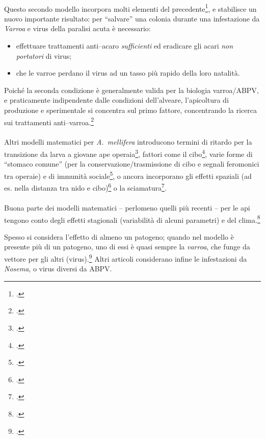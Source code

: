 \paragraph{}
Questo secondo modello incorpora molti elementi del precedente\footcite{khoury2011}, e stabilisce un nuovo
importante risultato: per ``salvare'' una colonia durante una infestazione da \emph{Varroa} e virus della
paralisi acuta è necessario:
\begin{itemize}
    \item effettuare trattamenti anti--acaro \emph{sufficienti} ed eradicare gli acari \emph{non portatori} di virus;
    \item che le varroe perdano il virus ad un tasso più rapido della loro natalità.
\end{itemize}

Poiché la seconda condizione è generalmente valida per la biologia varroa/ABPV, e praticamente indipendente
dalle condizioni dell'alveare, l'apicoltura di produzione e sperimentale si concentra sul primo fattore,
concentrando la ricerca sui trattamenti anti--varroa.\footcite{privFDL}

\paragraph{}
Altri modelli matematici per \emph{A.~mellifera} introducono termini di ritardo per la transizione da larva
a giovane ape operaia\footcite{messan2021}, fattori come il cibo\footcite{khoury2013,perry2015rapid},
varie forme di ``stomaco comune'' (per la conservazione/trasmissione di cibo e segnali feromonici tra operaie)
e di immunità sociale\footcite{schmickl2016,schmickl2017,laomettachit2021},
o ancora incorporano gli effetti spaziali (ad es. nella distanza tra nido e cibo)\footcite{spatial}
o la sciamatura\footcite{messan2017}.

\paragraph{}
Buona parte dei modelli matematici -- perlomeno quelli più recenti -- per le api tengono conto degli effetti
stagionali (\ie variabilità di alcuni parametri) e del clima.\footcite{chen_review}

Spesso si considera l'effetto di almeno un patogeno; quando nel modello è presente più di un patogeno,
uno di essi è quasi sempre la \emph{varroa}, che funge da vettore per gli altri (virus).\footcite{chen_review}
Altri articoli considerano infine le infestazioni da \emph{Nosema}, o virus diversi da ABPV.

